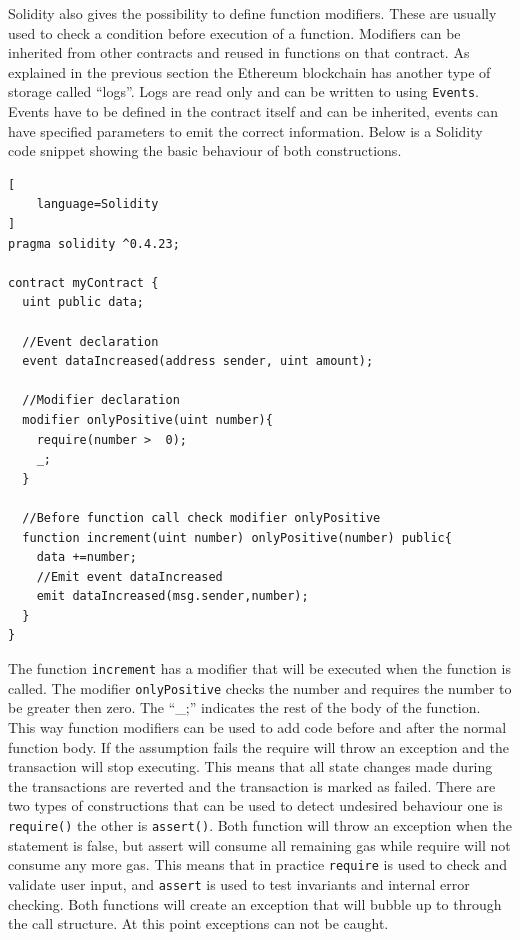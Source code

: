 \documentclass[a4paper]{article}
\begin{document}
Solidity also gives the possibility to define function modifiers. These are usually used to check a condition before execution of a function. Modifiers can be inherited from other contracts and reused in functions on that contract. As explained in the previous section the Ethereum blockchain has another type of storage called ``logs''.  Logs are read only and can be written to using \texttt{Events}. Events have to be defined in the contract itself and can be inherited, events can have specified parameters to emit the correct information. Below is a Solidity code snippet showing the basic behaviour of both constructions.
\begin{lstlisting}[
    language=Solidity
]
pragma solidity ^0.4.23;

contract myContract {
  uint public data; 
  
  //Event declaration
  event dataIncreased(address sender, uint amount);
  
  //Modifier declaration
  modifier onlyPositive(uint number){
    require(number >  0);
    _;
  }
  
  //Before function call check modifier onlyPositive
  function increment(uint number) onlyPositive(number) public{
    data +=number;
    //Emit event dataIncreased
    emit dataIncreased(msg.sender,number);
  }
} 
\end{lstlisting}
The function \texttt{increment} has a modifier that will be executed when the function is called. The modifier \texttt{onlyPositive} checks the number and requires the number to be greater then zero. The ``\_;'' indicates the rest of the body of the function. This way function modifiers can be used to add code before and after the normal function body. If the assumption fails the require will throw an exception and the transaction will stop executing. This means that all state changes made during the transactions are reverted and the transaction is marked as failed. There are two types of constructions that can be used to detect undesired behaviour one is \texttt{require()} the other is \texttt{assert()}. Both function will throw an exception when the statement is false, but assert will consume all remaining gas while require will not consume any more gas. This means that in practice \texttt{require} is used to check and validate user input, and \texttt{assert} is used to test invariants and internal error checking. Both functions will create an exception that will bubble up to through the call structure. At this point exceptions can not be caught.
\end{document}
